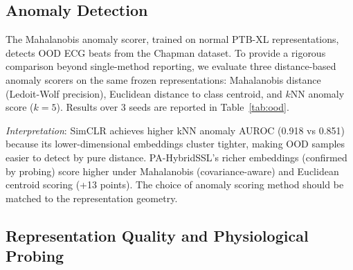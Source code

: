 \documentclass[journal,10pt]{IEEEtran}
\begin{document}
\subsection{Anomaly Detection}

The Mahalanobis anomaly scorer, trained on normal PTB-XL representations, detects OOD ECG beats from the Chapman dataset. To provide a rigorous comparison beyond single-method reporting, we evaluate three distance-based anomaly scorers on the same frozen representations: Mahalanobis distance (Ledoit-Wolf precision), Euclidean distance to class centroid, and $k$NN anomaly score ($k=5$). Results over 3 seeds are reported in Table~\ref{tab:ood}.

\begin{table}[h]
\centering
\caption{OOD detection comparison: PTB-XL (in-distribution) vs.\ Chapman-Shaoxing (OOD). AUROC and detection rate at 95\% specificity (DR@95\%), mean over 3 seeds.}
\label{tab:ood}
\end{table}

\noindent\textit{Interpretation}: SimCLR achieves higher kNN anomaly AUROC (0.918 vs 0.851) because its lower-dimensional embeddings cluster tighter, making OOD samples easier to detect by pure distance. PA-HybridSSL's richer embeddings (confirmed by probing) score higher under Mahalanobis (covariance-aware) and Euclidean centroid scoring (+13 points). The choice of anomaly scoring method should be matched to the representation geometry.

\subsection{Representation Quality and Physiological Probing}
\label{sec:probing}
\end{document}
